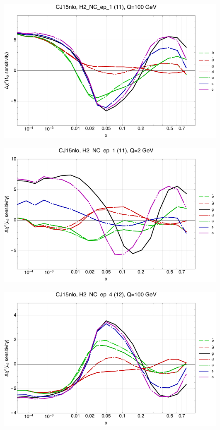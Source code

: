 \documentclass[10pt,aps,prd,floatfix,titlepage]{revtex4}
\begin{document}
\begin{figure}
\includegraphics[width=\textwidth,height=0.44\textheight,keepaspectratio]{1/11_CJ15nlo_L2_q100_Sf_1.pdf}
\caption{}
\end{figure}
\begin{figure}
\includegraphics[width=\textwidth,height=0.44\textheight,keepaspectratio]{1/11_CJ15nlo_L2_q2_Sf_1.pdf}
\caption{}
\end{figure}
\clearpage
\begin{figure}
\includegraphics[width=\textwidth,height=0.44\textheight,keepaspectratio]{1/12_CJ15nlo_L2_q100_Sf_1.pdf}
\caption{}
\end{figure}
\end{document}
